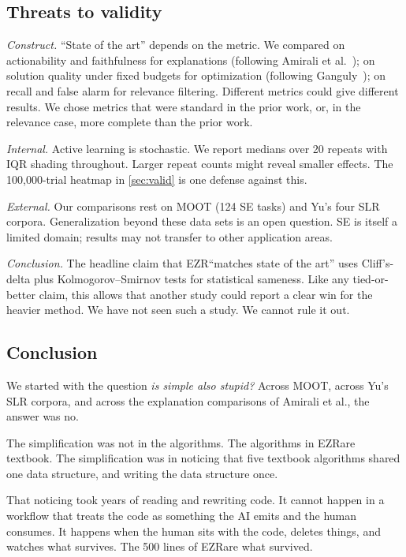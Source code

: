 \documentclass[AMA,STIX2COL]{WileyNJDv5}
\newcommand{\IT}{{\sffamily EZR}}
\begin{document}
{\subsection{Threats to validity}

\textit{Construct.} ``State of the art'' depends on the
metric. We compared on actionability and faithfulness for
explanations (following Amirali et al.~\cite{amirali}); on
solution quality under fixed budgets for optimization
(following Ganguly~\cite{kashin}); on recall and false alarm
for relevance filtering. Different metrics could give
different results. We chose metrics that were standard in the
prior work, or, in the relevance case, more complete than the
prior work.

\textit{Internal.} Active learning is stochastic. We report
medians over 20 repeats with IQR shading throughout. Larger
repeat counts might reveal smaller effects. The 100{,}000-trial
heatmap in \cref{sec:valid} is one defense against this.

\textit{External.} Our comparisons rest on MOOT (124 SE tasks)
and Yu's four SLR corpora. Generalization beyond these data
sets is an open question. SE is itself a limited domain;
results may not transfer to other application areas.

\textit{Conclusion.} The headline claim that \IT ``matches
state of the art'' uses Cliff's-delta plus
Kolmogorov--Smirnov tests for statistical sameness. Like any
tied-or-better claim, this allows that another study could
report a clear win for the heavier method. We have not seen
such a study. We cannot rule it out.

\subsection{Conclusion}

We started with the question {\em is simple also stupid?}
Across MOOT, across Yu's SLR corpora, and across the
explanation comparisons of Amirali et al., the answer was no.

The simplification was not in the algorithms. The algorithms
in \IT are textbook. The simplification was in noticing that
five textbook algorithms shared one data structure, and
writing the data structure once.

That noticing took years of reading and rewriting code. It
cannot happen in a workflow that treats the code as something
the AI emits and the human consumes. It happens when the human
sits with the code, deletes things, and watches what survives.
The 500 lines of \IT are what survived.

}
\end{document}

